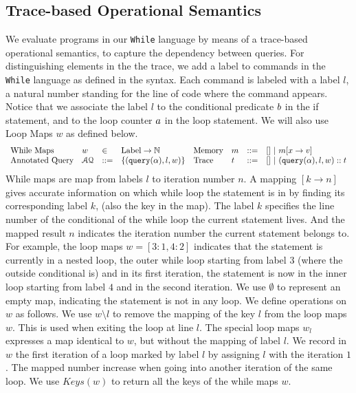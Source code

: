 \documentclass[a4paper,11pt]{article}
\begin{document}
\subsection{ Trace-based Operational Semantics}
{
We evaluate programs in our {\tt While} language by means of a trace-based operational semantics, to capture the dependency between queries. For distinguishing elements in the the trace, we add a label to commands in the {\tt While} language as defined in the syntax.
%
Each command is labeled with a label $l$, a natural number standing for the line of code where the command appears. Notice that we associate the label $l$ to the conditional predicate $b$ in the if statement, and to the loop counter $a$ in the loop statement. We will also use  Loop Maps $w$ as defined below.  
%
\[
	\begin{array}{llll}
	\mbox{While Maps} & w & \in & \mbox{Label} \to \mathbb{N} \\
	\mbox{Annotated Query} & \mathcal{AQ}  & ::= 
		& \{ ({\tt query}(\alpha), l, w)   \} \\
	\end{array}
	\begin{array}{llll}
	\mbox{Memory} & m & ::= & [] ~|~ m[x \to v] \\
	\mbox{Trace} & t & ::= 
		& [] ~|~ ( {\tt query}(\alpha), l, w) :: t \\
	\end{array}
\]
%
  	While maps are map from labels $l$ to iteration number $n$.
%
  	A mapping $[k \to n]$ gives accurate information on which while loop the statement is in by finding its corresponding label $k$, (also the key in the map). The label $k$ specifies the line number of the conditional of the while loop the current statement lives. And the mapped result $n$ indicates the iteration number the current statement belongs to. For example, the loop maps $w=[3:1, 4:2]$ indicates that the statement is currently in a nested loop, the outer while loop starting from label $3$ (where the outside conditional is) and in its first iteration, the statement is now in the inner loop starting from label $4$ and in the second iteration. We use $\emptyset$ to represent an empty map, indicating the statement is not in any loop. We define operations on $w$ as follows.
  	\todo{
	\[
	\begin{array}{lll}
	w \setminus l     & = w  & l \not\in Keys(w)   \\
	     & = w' & w = w' [l \to \_] \\
	w + l & = w[l \to 0] & l \not \in Keys(w) \\   
	     & = w'[l \to n+1] &  w = w'[l \to n]
	\end{array}
	\]
	}
%
  	We use $w \setminus l$ to remove the mapping of the key $l$ from the loop maps $w$. This is used when exiting the loop at line $l$. The special loop maps $w_l$ expresses a map identical to $w$, but without the mapping of label $l$. We record in $w$ the first iteration of a loop marked by label $l$ by assigning $l$ with the iteration $1$. The mapped number increase when going into another iteration of the same loop. We use $Keys(w)$ to return all the keys of the while maps $w$.
}
\end{document}
